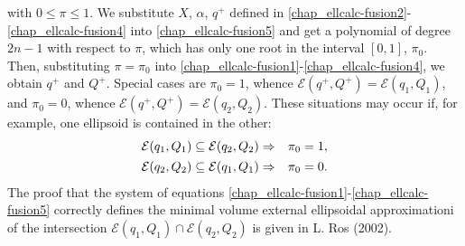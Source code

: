 \documentclass[letterpaper,10pt,english]{sphinxmanual}
\begin{document}
with $0\leqslant\pi\leqslant1$. We substitute $X$,
$\alpha$, $q^+$ defined in \eqref{chap_ellcalc-fusion2}-\eqref{chap_ellcalc-fusion4} into
\eqref{chap_ellcalc-fusion5} and get a polynomial of degree $2n-1$ with respect to
$\pi$, which has only one root in the interval $[0,1]$,
$\pi_0$. Then, substituting $\pi=\pi_0$ into
\eqref{chap_ellcalc-fusion1}-\eqref{chap_ellcalc-fusion4}, we obtain $q^+$ and $Q^+$. Special
cases are $\pi_0=1$, whence
${\mathcal E}(q^+,Q^+)={\mathcal E}(q_1,Q_1)$, and
$\pi_0=0$, whence
${\mathcal E}(q^+,Q^+)={\mathcal E}(q_2,Q_2)$. These situations
may occur if, for example, one ellipsoid is contained in the other:
\begin{gather}
\begin{split}{\mathcal E}(q_1,Q_1)\subseteq{\mathcal E}(q_2,Q_2) & \Rightarrow & \pi_0 = 1,\\\end{split}\notag\\\begin{split}{\mathcal E}(q_2,Q_2)\subseteq{\mathcal E}(q_1,Q_1) & \Rightarrow & \pi_0 = 0.\\\end{split}\notag
\end{gather}
The proof that the system of equations \eqref{chap_ellcalc-fusion1}-\eqref{chap_ellcalc-fusion5} correctly
defines the minimal volume external ellipsoidal approximationi of the
intersection ${\mathcal E}(q_1,Q_1)\cap{\mathcal E}(q_2,Q_2)$ is
given in L. Ros (2002).
\end{document}

